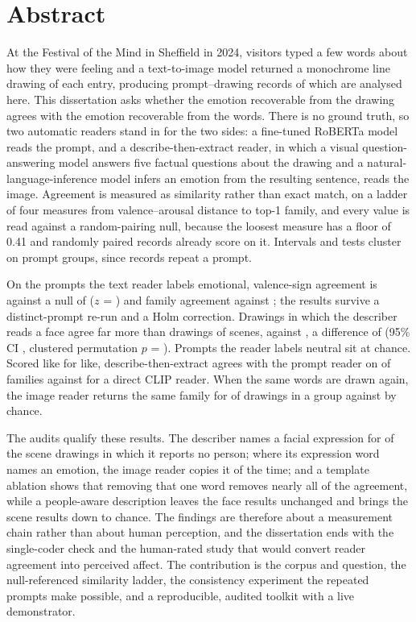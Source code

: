 \chapter*{\Large \center Abstract}

At the Festival of the Mind in Sheffield in 2024, visitors typed a few words about how they were feeling and a text-to-image model returned a monochrome line drawing of each entry, producing \nTotal{} prompt--drawing records of which \nAnalysed{} are analysed here. This dissertation asks whether the emotion recoverable from the drawing agrees with the emotion recoverable from the words. There is no ground truth, so two automatic readers stand in for the two sides: a fine-tuned RoBERTa model reads the prompt, and a describe-then-extract reader, in which a visual question-answering model answers five factual questions about the drawing and a natural-language-inference model infers an emotion from the resulting sentence, reads the image. Agreement is measured as similarity rather than exact match, on a ladder of four measures from valence--arousal distance to top-1 family, and every value is read against a random-pairing null, because the loosest measure has a floor of 0.41 and randomly paired records already score \FullNeuVaNull{} on it. Intervals and tests cluster on prompt groups, since \nRepeats{} records repeat a prompt.

On the \nEmotional{} prompts the text reader labels emotional, valence-sign agreement is \FullEmoSignObs{} against a null of \FullEmoSignNull{} ($z$ = \FullEmoSignZ{}) and family agreement \FullEmoFamObs{} against \FullEmoFamNull{}; the results survive a distinct-prompt re-run and a Holm correction. Drawings in which the describer reads a face agree far more than drawings of scenes, \FullFaceSignObs{} against \FullSceneSignObs{}, a difference of \DiffSignPp{} (95\% CI \DiffSignCi{}, clustered permutation $p$ = \DiffSignP{}). Prompts the reader labels neutral sit at chance. Scored like for like, describe-then-extract agrees with the prompt reader on \McDeFam{} of families against \McClipFam{} for a direct CLIP reader. When the same words are drawn again, the image reader returns the same family for \ConsFam{} of drawings in a group against \ConsFamNull{} by chance.

The audits qualify these results. The describer names a facial expression for \DescScenePeopleZeroExpr{} of the \DescScenePeopleZero{} scene drawings in which it reports no person; where its expression word names an emotion, the image reader copies it \DescCopyStrict{} of the time; and a template ablation shows that removing that one word removes nearly all of the agreement, while a people-aware description leaves the face results unchanged and brings the scene results down to chance. The findings are therefore about a measurement chain rather than about human perception, and the dissertation ends with the single-coder check and the human-rated study that would convert reader agreement into perceived affect. The contribution is the corpus and question, the null-referenced similarity ladder, the consistency experiment the repeated prompts make possible, and a reproducible, audited toolkit with a live demonstrator.
